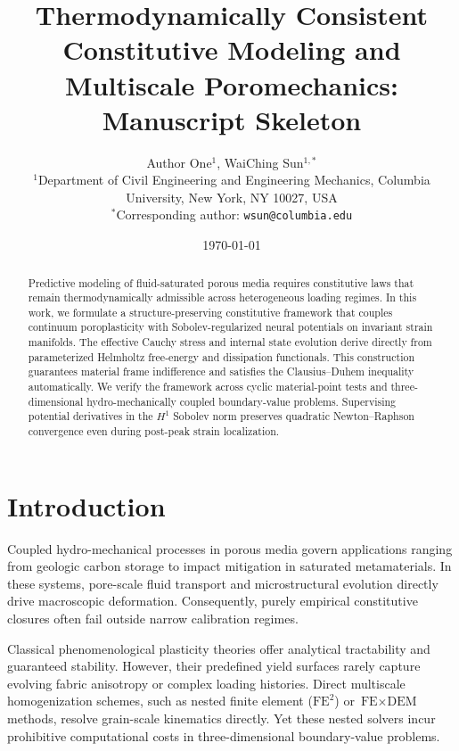 \documentclass[11pt,a4paper]{article}
\title{Thermodynamically Consistent Constitutive Modeling and Multiscale Poromechanics: Manuscript Skeleton}
\author{Author One$^{1}$, WaiChing Sun$^{1,*}$ \\
\small $^{1}$Department of Civil Engineering and Engineering Mechanics, Columbia University, New York, NY 10027, USA \\
\small $^{*}$Corresponding author: \texttt{wsun@columbia.edu}}
\date{\today}
\begin{document}
\maketitle

\begin{abstract}
Predictive modeling of fluid-saturated porous media requires constitutive laws that remain thermodynamically admissible across heterogeneous loading regimes.
In this work, we formulate a structure-preserving constitutive framework that couples continuum poroplasticity with Sobolev-regularized neural potentials on invariant strain manifolds.
The effective Cauchy stress and internal state evolution derive directly from parameterized Helmholtz free-energy and dissipation functionals. This construction guarantees material frame indifference and satisfies the Clausius--Duhem inequality automatically.
We verify the framework across cyclic material-point tests and three-dimensional hydro-mechanically coupled boundary-value problems. Supervising potential derivatives in the $H^1$ Sobolev norm preserves quadratic Newton--Raphson convergence even during post-peak strain localization.
\end{abstract}

\section{Introduction}
\label{sec:intro}

Coupled hydro-mechanical processes in porous media govern applications ranging from geologic carbon storage to impact mitigation in saturated metamaterials. In these systems, pore-scale fluid transport and microstructural evolution directly drive macroscopic deformation. Consequently, purely empirical constitutive closures often fail outside narrow calibration regimes.

Classical phenomenological plasticity theories offer analytical tractability and guaranteed stability. However, their predefined yield surfaces rarely capture evolving fabric anisotropy or complex loading histories. Direct multiscale homogenization schemes, such as nested finite element ($\text{FE}^2$) or $\text{FE}\times\text{DEM}$ methods, resolve grain-scale kinematics directly. Yet these nested solvers incur prohibitive computational costs in three-dimensional boundary-value problems.
\end{document}
